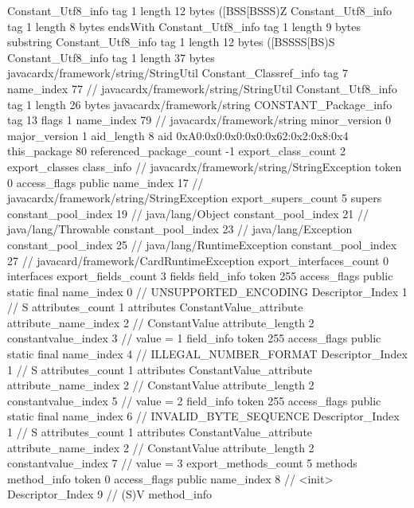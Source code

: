 {{{		}
		Constant_Utf8_info {
			tag	1
			length	12
			bytes	([BSS[BSSS)Z
		}
		Constant_Utf8_info {
			tag	1
			length	8
			bytes	endsWith
		}
		Constant_Utf8_info {
			tag	1
			length	9
			bytes	substring
		}
		Constant_Utf8_info {
			tag	1
			length	12
			bytes	([BSSSS[BS)S
		}
		Constant_Utf8_info {
			tag	1
			length	37
			bytes	javacardx/framework/string/StringUtil
		}
		Constant_Classref_info {
			tag	7
			name_index	77		// javacardx/framework/string/StringUtil
		}
		Constant_Utf8_info {
			tag	1
			length	26
			bytes	javacardx/framework/string
		}
		CONSTANT_Package_info {
			tag	13
			flags	1
			name_index	79		// javacardx/framework/string
			minor_version	0
			major_version	1
			aid_length	8
			aid	0xA0:0x0:0x0:0x0:0x62:0x2:0x8:0x4
		}
	}
	this_package	80
	referenced_package_count	-1
	export_class_count	2
	export_classes {
		class_info {		// javacardx/framework/string/StringException
			token	0
			access_flags	public
			name_index	17		// javacardx/framework/string/StringException
			export_supers_count	5
			supers {
				constant_pool_index	19		// java/lang/Object
				constant_pool_index	21		// java/lang/Throwable
				constant_pool_index	23		// java/lang/Exception
				constant_pool_index	25		// java/lang/RuntimeException
				constant_pool_index	27		// javacard/framework/CardRuntimeException
			}
			export_interfaces_count	0
			interfaces {
			}
			export_fields_count	3
			fields {
			field_info {
				token	255
				access_flags	public static final
				name_index	0		// UNSUPPORTED_ENCODING
				Descriptor_Index	1		// S
				attributes_count	1
				attributes {
				ConstantValue_attribute {
					attribute_name_index	2		// ConstantValue
					attribute_length	2
					constantvalue_index	3		// value = 1
				}
				}
			}
			field_info {
				token	255
				access_flags	public static final
				name_index	4		// ILLEGAL_NUMBER_FORMAT
				Descriptor_Index	1		// S
				attributes_count	1
				attributes {
				ConstantValue_attribute {
					attribute_name_index	2		// ConstantValue
					attribute_length	2
					constantvalue_index	5		// value = 2
				}
				}
			}
			field_info {
				token	255
				access_flags	public static final
				name_index	6		// INVALID_BYTE_SEQUENCE
				Descriptor_Index	1		// S
				attributes_count	1
				attributes {
				ConstantValue_attribute {
					attribute_name_index	2		// ConstantValue
					attribute_length	2
					constantvalue_index	7		// value = 3
				}
				}
			}
			}
			export_methods_count	5
			methods {
				method_info {
					token	0
					access_flags	public
					name_index	8		// <init>
					Descriptor_Index	9		// (S)V
				}
				method_info {
}}}}}
